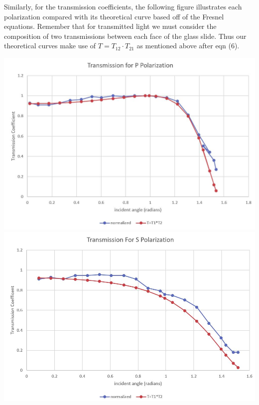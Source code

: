 \documentclass[letter, 11pt, onecolumn]{article}
\begin{document}
\noindent Similarly, for the transmission coefficients, the following figure illustrates each polarization compared with its theoretical curve based off of the Fresnel equations. Remember that for transmitted light we must consider the composition of two transmissions between each face of the glass slide. Thus our theoretical curves make use of $T = T_{12}\cdot T_{21}$ as mentioned above after eqn (6).\\ 
	\begin{center}
		\includegraphics[width=0.75\columnwidth]{trans_p}\\
		\includegraphics[width=0.75\columnwidth]{trans_s}
	\end{center}
	
\end{document}
